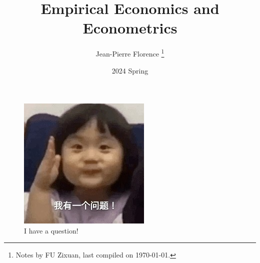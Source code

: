 \documentclass[12pt]{article}
\title{Empirical Economics and Econometrics }
\author{Jean-Pierre Florence \thanks{Notes by FU Zixuan, last compiled on \today.}}
\date{2024 Spring}
\begin{document}
\maketitle

\begin{figure}[h]
    \centering
    \includegraphics{figures/ihaveaquestion.jpg}
    \caption*{I have a question!}
\end{figure}



\newpage
\tableofcontents
\newpage



\newpage
\end{document}
